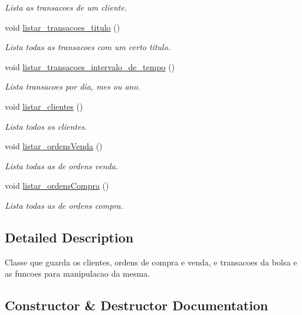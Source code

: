 \begin{DoxyCompactItemize}
\begin{DoxyCompactList}\small\item\em Lista as transacoes de um cliente. \end{DoxyCompactList}\item 
void \hyperlink{class_bolsa_aeac084d57bf9382c83516f1f0c043936}{listar\+\_\+transacoes\+\_\+titulo} ()
\begin{DoxyCompactList}\small\item\em Lista todas as transacoes com um certo titulo. \end{DoxyCompactList}\item 
void \hyperlink{class_bolsa_acb012fa60aa074fd861168ca3aedadd0}{listar\+\_\+transacoes\+\_\+intervalo\+\_\+de\+\_\+tempo} ()
\begin{DoxyCompactList}\small\item\em Lista transacoes por dia, mes ou ano. \end{DoxyCompactList}\item 
void \hyperlink{class_bolsa_aba662f57e78213bee6de3db7c06c7293}{listar\+\_\+clientes} ()
\begin{DoxyCompactList}\small\item\em Lista todos os clientes. \end{DoxyCompactList}\item 
void \hyperlink{class_bolsa_abd28d5b93c338a05deccf0adbac23ba1}{listar\+\_\+ordens\+Venda} ()
\begin{DoxyCompactList}\small\item\em Lista todas as de ordens venda. \end{DoxyCompactList}\item 
void \hyperlink{class_bolsa_a419cf3df5db87b4925eb616af1180f88}{listar\+\_\+ordens\+Compra} ()
\begin{DoxyCompactList}\small\item\em Lista todas as de ordens compra. \end{DoxyCompactList}\end{DoxyCompactItemize}


\subsection{Detailed Description}
Classe que guarda os clientes, ordens de compra e venda, e transacoes da bolsa e as funcoes para manipulacao da mesma. 

\subsection{Constructor \& Destructor Documentation}
\hypertarget{class_bolsa_a79eb058719d17c21fab6c4b95db8c1b6}{}\label{class_bolsa_a79eb058719d17c21fab6c4b95db8c1b6} 
